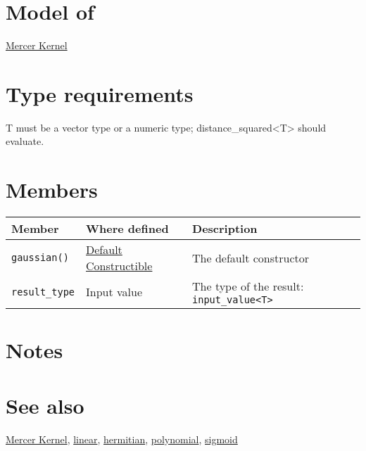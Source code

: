 \documentclass{article}
\begin{document}
\section*{Model of}

\href{\kmlroot/mercer_kernel.html}{Mercer Kernel}

\section*{Type requirements}
T must be a vector type or a numeric type; distance_squared<T> should evaluate.

\section*{Members}

\begin{tabular}{lll}
\textbf{Member} & \textbf{Where defined} & \textbf{Description} \\ 
\hline
\texttt{gaussian()} & \href{http://www.sgi.com/tech/stl/DefaultConstructible.html}{Default Constructible} & The default constructor \\
\texttt{result_type} & Input value & The type of the result: \texttt{input_value<T>} \\
\end{tabular}

\section*{Notes}

\section*{See also}

\href{\kmlroot/mercer_kernel.html}{Mercer Kernel},
\href{\kmlroot/linear.html}{linear},
\href{\kmlroot/hermitian.html}{hermitian},
\href{\kmlroot/polynomial.html}{polynomial},
\href{\kmlroot/sigmoid.html}{sigmoid}



\end{document}
